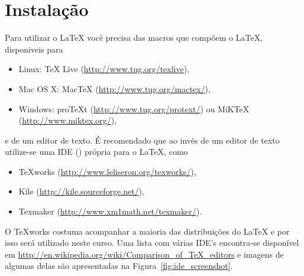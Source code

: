 \section{Instala\c{c}\~{a}o}
Para utilizar o LaTeX voc\^{e} precisa das macros que comp\~{o}em o LaTeX, disponiveis para
\begin{itemize}
    \item Linux: TeX Live (\url{http://www.tug.org/texlive}),
    \item Mac OS X: MacTeX (\url{http://www.tug.org/mactex/}),
    \item Windows: proTeXt (\url{http://www.tug.org/protext/}) ou MiKTeX (\url{http://www.miktex.org/}),
\end{itemize}
e de um editor de texto. \'{E} recomendado que ao inv\'{e}s de um editor de texto utilize-se uma IDE () pr\'{o}pria para o LaTeX, como
\begin{itemize}
    \item TeXworks (\url{http://www.leliseron.org/texworks/}),
    \item Kile (\url{http://kile.sourceforge.net/}),
    \item Texmaker (\url{http://www.xm1math.net/texmaker/}).
\end{itemize}
O TeXworks costuma acompanhar a maioria das distribui\c{c}\~{o}es do LaTeX e por isso ser\'{a} utilizado neste curso. Uma lista com v\'{a}rias IDE's encontra-se dispon\'{i}vel em \url{http://en.wikipedia.org/wiki/Comparison_of_TeX_editors}\nocite{Wikipedia:EN:Comparison_TeX_editors} e imagens de algumas delas s\~{a}o apresentadas na Figura~\ref{fig:ide_screenshot}.
